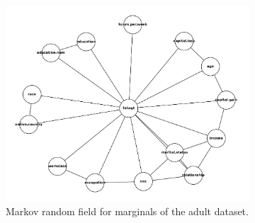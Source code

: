 \documentclass[manuscript,screen,review,anonymous]{acmart}
\begin{document}


\begin{figure}
  \centering
  \begin{subfigure}[b]{0.3\textwidth}
      \centering
      \includegraphics[width=\textwidth]{adult_mst}
      \caption{Markov random field for marginals of the adult dataset.}
      \label{fig:adult_mst}
  \end{subfigure}
  \hfill
  \begin{subfigure}[b]{0.3\textwidth}
      \centering

\end{subfigure}
\end{figure}
\end{document}
